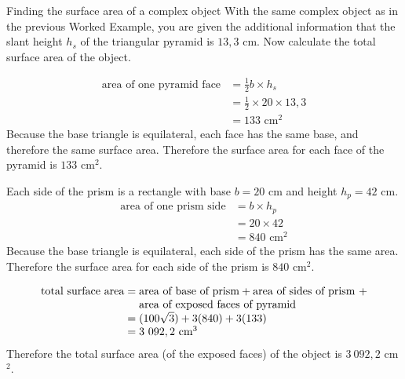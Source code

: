 \begin{wex}{Finding the surface area of a complex object}
{With the same complex object as in the previous Worked Example, you are given
  the additional information that the slant height $h_s$ of the
  triangular pyramid is $13,3$ cm. Now calculate the total surface area
  of the object.}
{
\begin{align*}
  \mbox{area of one pyramid face}
  &= \frac{1}{2}b \times h_s \\
  &= \frac{1}{2} \times 20 \times 13,3 \\
  &= 133\mbox{ cm}^2
\end{align*}
Because the base triangle is equilateral, each face has the same base,
and therefore the same surface area. Therefore the surface area for
each face of the pyramid is $133$ cm$^{2}$.

Each side of the prism is a rectangle with base $b = 20$ cm and height
$h_p = 42$ cm.
\begin{align*}
  \mbox{area of one prism side}
  &= b \times h_p \\
  &= 20 \times 42 \\
  &= 840\mbox{ cm}^2
\end{align*}
Because the base triangle is equilateral, each side of the prism has
the same area. Therefore the surface area for each side of the prism
is $840$ cm$^{2}$.

\begin{equation*}
  \begin{array}{r@{\;}c@{\;}l}
    \mbox{total surface area} &=& \mbox{area of base of prism} + \mbox{area of sides of prism } + \\
                              & & \mbox{area of exposed faces of pyramid} \\
    &=& (100 \sqrt{3}) + 3(840) + 3(133) \\
    &=& 3~092,2\mbox{ cm}^3
  \end{array}
\end{equation*}
Therefore the total surface area (of the exposed faces) of the object is $3~092,2$ cm$^{2}$.
}
\end{wex}

